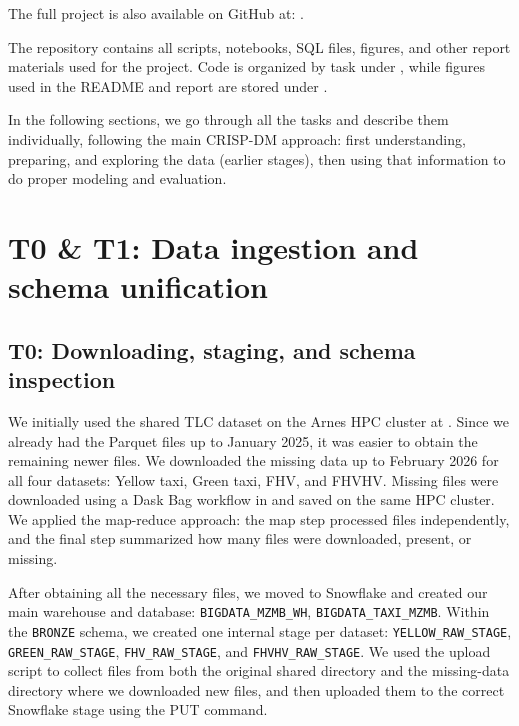 \documentclass[fleqn,moreauthors,9pt]{ds_report}
\begin{document}
The full project is also available on GitHub at: \textbf{}.

The repository contains all scripts, notebooks, SQL files, figures, and other report materials used for the project. Code is organized by task under , while figures used in the README and report are stored under .

In the following sections, we go through all the tasks and describe them individually, following the main CRISP-DM approach: first understanding, preparing, and exploring the data (earlier stages), then using that information to do proper modeling and evaluation.


\section*{T0 \& T1: Data ingestion and schema unification}

\subsection*{T0: Downloading, staging, and schema inspection}

We initially used the shared TLC dataset on the Arnes HPC cluster at . Since we already had the Parquet files up to January 2025, it was easier to obtain the remaining newer files. We downloaded the missing data up to February 2026 for all four datasets: Yellow taxi, Green taxi, FHV, and FHVHV. Missing files were downloaded using a Dask Bag workflow in  and saved on the same HPC cluster. We applied the map-reduce approach: the map step processed files independently, and the final step summarized how many files were downloaded, present, or missing.

After obtaining all the necessary files, we moved to Snowflake and created our main warehouse and database: \texttt{BIGDATA\_MZMB\_WH}, \texttt{BIGDATA\_TAXI\_MZMB}. Within the \texttt{BRONZE} schema, we created one internal stage per dataset: \texttt{YELLOW\_RAW\_STAGE}, \texttt{GREEN\_RAW\_STAGE}, \texttt{FHV\_RAW\_STAGE}, and \texttt{FHVHV\_RAW\_STAGE}. We used the upload script  to collect files from both the original shared directory and the missing-data directory where we downloaded new files, and then uploaded them to the correct Snowflake stage using the PUT command.
\end{document}
